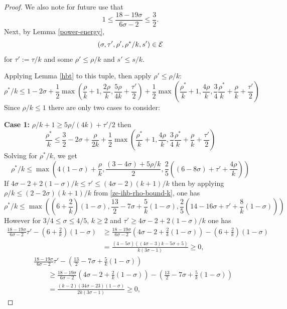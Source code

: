 \begin{proof}
We also note for future use that 
\begin{equation}\label{ze-ihb-bound-tau-factor}
1 \le \frac{18 - 19\sigma}{6\sigma - 2} \le \frac{3}{2}.
\end{equation}
Next, by Lemma \ref{power-energy}, 
\[
(\sigma, \tau', \rho', \rho^*/k, s') \in \mathcal{E}
\]
for $\tau' := \tau/k$ and some $\rho' \le \rho/k$ and $s' \le s/k$. 

Applying Lemma \ref{hbt} to this tuple, then apply $\rho' \le \rho/k$:
\[
\rho^*/k \leq 1-2\sigma + \frac{1}{2}\max(\frac{\rho}{k}+1, \frac{2\rho}{k}, \frac{5\rho}{4k} + \frac{\tau'}{2}) + \frac{1}{2}\max(\frac{\rho^*}{k}+1, \frac{4\rho}{k}, \frac{3}{4}\frac{\rho^*}{k} +\frac{\rho}{k}+\frac{\tau'}{2})
\]
Since $\rho/k \le 1$ there are only two cases to consider:

\textbf{Case 1:} $\rho/k + 1 \ge 5\rho/(4k) + \tau'/2$ then 
\[
\frac{\rho^*}{k} \le \frac{3}{2} - 2\sigma + \frac{\rho}{2k} + \frac{1}{2}\max(\frac{\rho^*}{k}+1, \frac{4\rho}{k}, \frac{3}{4}\frac{\rho^*}{k} +\frac{\rho}{k}+\frac{\tau'}{2})
\]
Solving for $\rho^*/k$, we get 
\[
\rho^*/k \le \max(4(1 - \sigma) + \frac{\rho}{k}, \frac{(3 - 4\sigma) + 5\rho/k}{2}, \frac{2}{5}((6 - 8\sigma) + \tau' + \frac{4\rho}{k}))
\]
If $4\sigma - 2 + 2(1 - \sigma)/k \le \tau' \le (4\sigma - 2)(k + 1)/k$ then by applying $\rho/k \le (2 - 2\sigma)(k + 1)/k$ from \eqref{ze-ihb-rho-bound-k}, one has
\[
\rho^*/k \le \max((6 + \frac{2}{k})(1 - \sigma), \frac{13}{2} - 7\sigma + \frac{5}{k} (1 - \sigma), \frac{2}{5}(14 - 16\sigma + \tau' + \frac{8}{k}(1 - \sigma)))
\]
However for $3/4 \le \sigma \le 4/5$, $k \ge 2$ and $\tau' \ge 4\sigma - 2 + 2(1 - \sigma)/k$ one has  
\begin{align*}
\frac{18 - 19\sigma}{6\sigma - 2}\tau' - (6 + \frac{2}{k})(1 - \sigma) &\ge \frac{18 - 19\sigma}{6\sigma - 2}(4\sigma - 2 + \frac{2}{k}(1 - \sigma)) - (6 + \frac{2}{k})(1 - \sigma) \\
&= \frac{(4 - 5\sigma) ((4\sigma - 3)k - 5\sigma + 5)}{k(3\sigma - 1)} \ge 0,
\end{align*}
\begin{align*}
&\frac{18 - 19\sigma}{6\sigma - 2}\tau' - \left(\frac{13}{2} - 7\sigma + \frac{5}{k} (1 - \sigma)\right) \\
&\qquad\ge \frac{18 - 19\sigma}{6\sigma - 2}(4\sigma - 2 + \frac{2}{k}(1 - \sigma)) - \left(\frac{13}{2} - 7\sigma + \frac{5}{k} (1 - \sigma)\right) \\
&\qquad= \frac{(k - 2) (34\sigma - 23) (1 - \sigma)}{2 k (3\sigma - 1)} \ge 0,
\end{align*}

\end{proof}

